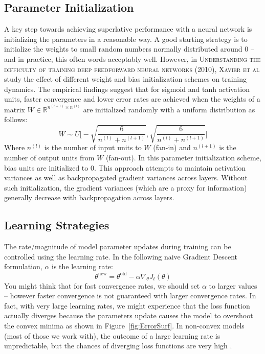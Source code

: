 \documentclass{tufte-handout}
\begin{document}
\subsection{Parameter Initialization}

A key step towards achieving superlative performance with a neural network is initializing the parameters in a reasonable way.  A good starting strategy is to initialize the weights to small random numbers normally distributed around $0$ -- and in practice, this often words acceptably well.
However, in \textsc{Understanding the difficulty of training deep feedforward neural networks (2010), Xavier et al} study the effect of different weight and bias initialization schemes on training dynamics. The empirical findings suggest that for sigmoid and tanh activation units, faster convergence and lower error rates are achieved when the weights of a matrix $W \in \mathbb{R}^{n^{(l+1)}\times n^{(l)}}$ are initialized randomly with a uniform distribution as follows:
$$W \sim U\bigg[-\sqrt{\frac{6}{n^{(l)} + n^{(l+1)}}}, \sqrt{\frac{6}{n^{(l)} + n^{(l+1)}}}\bigg]$$
Where $n^{(l)}$ is the number of input units to $W$ (fan-in) and  $n^{(l+1)}$ is the number of output units from $W$ (fan-out).
In this parameter initialization scheme, bias units are initialized to $0$. This approach attempts to maintain activation variances as well as backpropagated gradient variances across layers. Without such initialization, the gradient variances (which are a proxy for information) generally decrease with backpropagation across layers.
\subsection{Learning Strategies}
The rate/magnitude of model parameter updates during training can be controlled using the learning rate. In the following naive Gradient Descent formulation, $\alpha$ is the learning rate:
$$ \theta^{\text{new}} = \theta^{\text{old}} - \alpha \nabla_{\theta}J_t(\theta)$$
You might think that for fast convergence rates, we should set $\alpha$ to larger values -- however faster convergence is not guaranteed with larger convergence rates. In fact, with very large learning rates, we might experience that the loss function actually diverges because the parameters update causes the model to overshoot the convex minima as shown in Figure~\ref{fig:ErrorSurf}. In non-convex models (most of those we work with), the outcome of a large learning rate is unpredictable, but the chances of diverging loss functions are very high .
\end{document}
